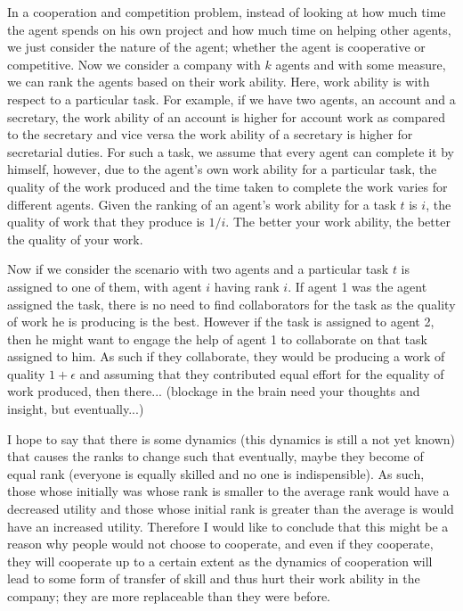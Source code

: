 \documentclass[a4paper,10pt]{article}
\theoremstyle{definition}
\begin{document}
In a cooperation and competition problem, instead of looking at how much time the agent spends on his own project and how much time on helping other agents, we just consider the nature of the agent; whether the agent is cooperative or competitive. Now we consider a company with $k$ agents and with some measure, we can rank the agents based on their work ability. Here, work ability is with respect to a particular task. For example, if we have two agents, an account and a secretary, the work ability of an account is higher for account work as compared to the secretary and vice versa the work ability of a secretary is higher for secretarial duties. For such a task, we assume that every agent can complete it by himself, however, due to the agent's own work ability for a particular task, the quality of the work produced and the time taken to complete the work varies for different agents. Given the ranking of an agent's work ability for a task $t$ is $i$, the quality of work that they produce is $1/i$. The better your work ability, the better the quality of your work.

Now if we consider the scenario with two agents and a particular task $t$ is assigned to one of them, with agent $i$ having rank $i$. If agent 1 was the agent assigned the task, there is no need to find collaborators for the task as the quality of work he is producing is the best. However if the task is assigned to agent 2, then he might want to engage the help of agent 1 to collaborate on that task assigned to him. As such if they collaborate, they would be producing a work of quality $1+\epsilon$ and assuming that they contributed equal effort for the equality of work produced, then there... (blockage in the brain need your thoughts and insight, but eventually...)

I hope to say that there is some dynamics (this dynamics is still a not yet known) that causes the ranks to change such that eventually, maybe they become of equal rank (everyone is equally skilled and no one is indispensible). As such, those whose initially was whose rank is smaller to the average rank would have a decreased utility and those whose initial rank is greater than the average is would have an increased utility. Therefore I would like to conclude that this might be a reason why people would not choose to cooperate, and even if they cooperate, they will cooperate up to a certain extent as the dynamics of cooperation will lead to some form of transfer of skill and thus hurt their work ability in the company; they are more replaceable than they were before.


\end{document}
